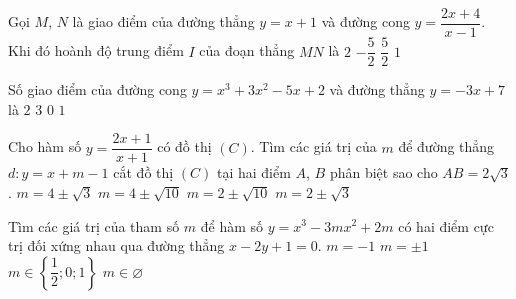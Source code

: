 \begin{ex}%
Gọi $M$, $N$ là giao điểm của đường thẳng $y=x+1$ và đường cong $y=\dfrac{2x+4}{x-1}$. Khi đó hoành độ trung điểm $I$ của đoạn thẳng $MN$ là
\choice
{$2$}
{$-\dfrac{5}{2}$}
{$\dfrac{5}{2}$}
{\True $1$}
\end{ex}
\begin{ex}%
Số giao điểm của đường cong $y=x^{3}+3x^{2}-5x+2$ và đường thẳng $y=-3x+7$ là
\choice
{$2$}
{\True $3$}
{$0$}
{$1$}
\end{ex}
\begin{ex}%
Cho hàm số $y=\dfrac{2x+1}{x+1}$ có đồ thị $(C)$. Tìm các giá trị của $m$ để đường thẳng $d:y=x+m-1$ cắt đồ thị $(C)$ tại hai điểm $A$, $B$ phân biệt sao cho $AB=2\sqrt{3}$.
\choice
{$m=4\pm\sqrt{3}$}
{\True $m=4\pm\sqrt{10}$}
{$m=2\pm\sqrt{10}$}
{$m=2\pm\sqrt{3}$}
\end{ex}
\begin{ex}%
Tìm các giá trị của tham số $m$ để hàm số $y=x^{3}-3mx^{2}+2m$ có hai điểm cực trị đối xứng nhau qua đường thẳng $x-2y+1=0$.
\choice
{\True $m=-1$}
{$m=\pm 1$}
{$m\in\left\{\dfrac{1}{2};0;1\right\}$}
{$m\in\varnothing$}
\end{ex}
